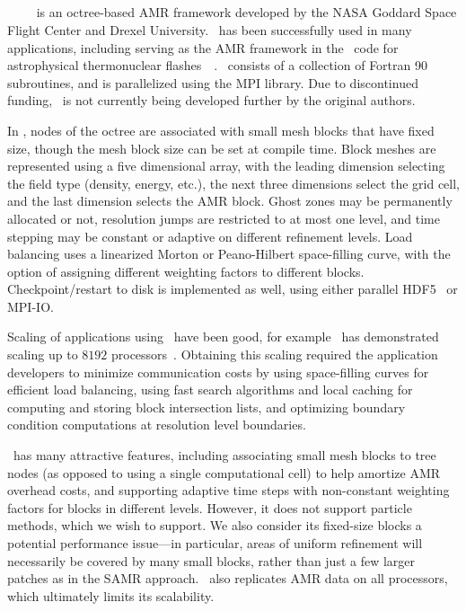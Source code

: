 \documentclass[10pt,twocolumn]{article}
\begin{document}
\subsection{\paramesh} \label{ss:paramesh}

\paramesh~\cite{MaOl00}~\cite{OlMa05}~\cite{Ol06}~\cite{wwwparamesh}
is an octree-based AMR framework developed by the NASA Goddard Space
Flight Center and Drexel University.  \paramesh\ has been successfully
used in many applications, including serving as the AMR framework in
the \flash\ code for astrophysical thermonuclear
flashes~\cite{FrOl00}~\cite{wwwflash}.  \paramesh\ consists of a
collection of Fortran 90 subroutines, and is parallelized using the
MPI library.  Due to discontinued funding, \paramesh\ is not currently
being developed further by the original authors.

In \paramesh, nodes of the octree are associated with small mesh
blocks that have fixed size, though the mesh block size can be set at
compile time.  Block meshes are represented using a five dimensional
array, with the leading dimension selecting the field type (density,
energy, etc.), the next three dimensions select the grid cell, and the
last dimension selects the AMR block.  Ghost zones may be permanently
allocated or not, resolution jumps are restricted to at most one
level, and time stepping may be constant or adaptive on different
refinement levels.  Load balancing uses a linearized Morton or
Peano-Hilbert space-filling curve, with the option of assigning
different weighting factors to different blocks.  Checkpoint/restart
to disk is implemented as well, using either parallel HDF5~\cite{hdf5}
or MPI-IO.

Scaling of applications using \paramesh\ have been good, for example
\flash\ has demonstrated scaling up to $8192$
processors~\cite{CoBe07}.  Obtaining this scaling required the
application developers to minimize communication costs by using
space-filling curves for efficient load balancing, using fast search
algorithms and local caching for computing and storing block
intersection lists, and optimizing boundary condition computations at
resolution level boundaries.

\paramesh\ has many attractive features, including associating small
mesh blocks to tree nodes (as opposed to using a single computational
cell) to help amortize AMR overhead costs, and supporting adaptive
time steps with non-constant weighting factors for blocks in different
levels.  However, it does not support particle methods, which we wish
to support.  We also consider its fixed-size blocks a potential
performance issue---in particular, areas of uniform refinement will
necessarily be covered by many small blocks, rather than just a few
larger patches as in the SAMR approach.  \paramesh\ also replicates
AMR data on all processors, which ultimately limits its scalability.
\end{document}
